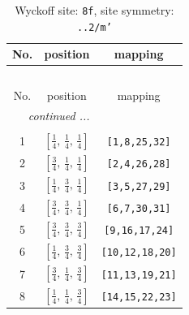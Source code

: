 \documentclass[fleqn,8pt]{jsarticle}
\begin{document}
\begin{longtable}{ccc}
\caption{Wyckoff site: {\tt 8f}, site symmetry: {\tt ..2/m'}}
 \\
 \hline \hline
No. & position & mapping \\ \hline \endfirsthead

\multicolumn{2}{l}{\tablename\ \thetable{}} \\
 \hline \hline
No. & position & mapping \\ \hline \endhead

 \hline \hline
\multicolumn{2}{r}{\footnotesize\it continued ...} \\ \endfoot

 \hline \hline
\multicolumn{2}{r}{} \\ \endlastfoot

1 & $\left[ \frac{1}{4},\, \frac{1}{4},\, \frac{1}{4} \right]$ & {\tt [1,8,25,32]} \\ \hline
2 & $\left[ \frac{3}{4},\, \frac{1}{4},\, \frac{1}{4} \right]$ & {\tt [2,4,26,28]} \\ \hline
3 & $\left[ \frac{1}{4},\, \frac{3}{4},\, \frac{1}{4} \right]$ & {\tt [3,5,27,29]} \\ \hline
4 & $\left[ \frac{3}{4},\, \frac{3}{4},\, \frac{1}{4} \right]$ & {\tt [6,7,30,31]} \\ \hline
5 & $\left[ \frac{3}{4},\, \frac{3}{4},\, \frac{3}{4} \right]$ & {\tt [9,16,17,24]} \\ \hline
6 & $\left[ \frac{1}{4},\, \frac{3}{4},\, \frac{3}{4} \right]$ & {\tt [10,12,18,20]} \\ \hline
7 & $\left[ \frac{3}{4},\, \frac{1}{4},\, \frac{3}{4} \right]$ & {\tt [11,13,19,21]} \\ \hline
8 & $\left[ \frac{1}{4},\, \frac{1}{4},\, \frac{3}{4} \right]$ & {\tt [14,15,22,23]} \\
\end{longtable}
\renewcommand{\arraystretch}{1.2}
\end{document}
